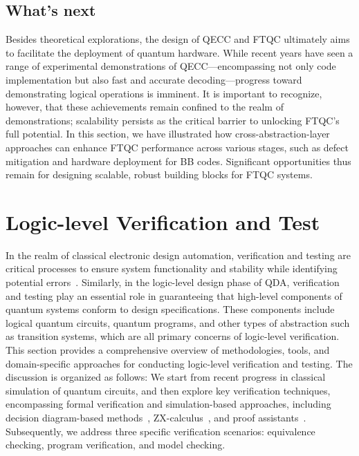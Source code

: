 \documentclass[a4paper,onecolumn,11pt,unpublished]{quantumarticle}
\begin{document}
\subsection{What's next}
Besides theoretical explorations, the design of QECC and FTQC ultimately aims to facilitate the deployment of quantum hardware. While recent years have seen a range of experimental demonstrations of QECC---encompassing not only code implementation but also fast and accurate decoding---progress toward demonstrating logical operations is imminent. It is important to recognize, however, that these achievements remain confined to the realm of demonstrations; scalability persists as the critical barrier to unlocking FTQC's full potential. In this section, we have illustrated how cross-abstraction-layer approaches can enhance FTQC performance across various stages, such as defect mitigation and hardware deployment for BB codes. Significant opportunities thus remain for designing scalable, robust building blocks for FTQC systems.

\section{Logic-level Verification and Test}
In the realm of classical electronic design automation, verification and testing are critical processes to ensure system functionality and stability while identifying potential errors~\cite{wangEDAsvt2009}. Similarly, in the logic-level design phase of QDA, verification and testing play an essential role in guaranteeing that high-level components of quantum systems conform to design specifications. These components include logical quantum circuits, quantum programs, and other types of abstraction such as transition systems, which are all primary concerns of logic-level verification. This section provides a comprehensive overview of methodologies, tools, and domain-specific approaches for conducting logic-level verification and testing. The discussion is organized as follows: We start from recent progress in classical simulation of quantum circuits, and then explore key verification techniques, encompassing formal verification and simulation-based approaches, including decision diagram-based methods~\cite{WilleDD2023}, ZX-calculus~\cite{Peham2022Equivalence}, and proof assistants~\cite{ZhouCoqq2023,KissingerQuantomatic2015,CharetonQbricks2020,LiuQHLprover2019}. Subsequently, we address three specific verification scenarios: equivalence checking, program verification, and model checking.
\end{document}
